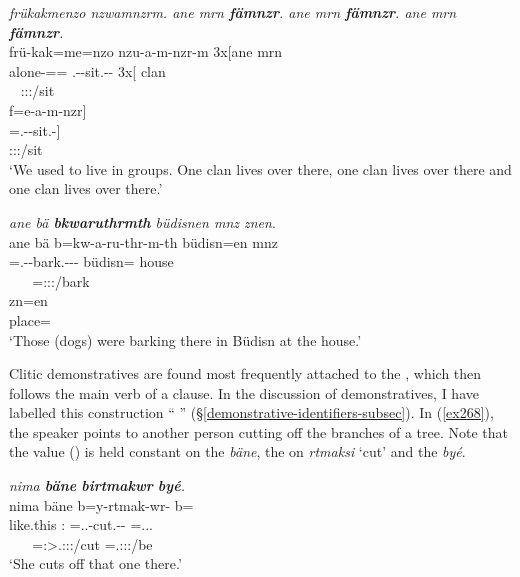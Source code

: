 \begin{exe}
	\ex \emph{frükakmenzo nzwamnzrm. ane mrn \textbf{fämnzr}. ane mrn \textbf{fämnzr}. ane mrn \textbf{fämnzr}.}\\
	\glll frü-kak=me=nzo nzu-a-m-nzr-m 3x[ane mrn\\
	alone-\Distr=\Ins={\Only} \Fnsg.\Betatwo-\Vc-sit.\Ext-\Ndu-\Dur{} 3x[{\Dem} clan\\
	~ {\footnotesize \Fpl:\Sbj:\Pst:\Dur/sit} ~ ~\\
	\sn
	\glll f=e-a-m-nzr]\\
	\Dist=\Stnsg.\Alph-\Vc-sit.\Ext-\Ndu]\\
	{\footnotesize \Stpl:\Sbj:\Nonpast:\Ipfv/sit}\\
	\trans `We used to live in groups. One clan lives over there, one clan lives over there and one clan lives over there.' 
	\label{ex266}
\end{exe}
\begin{exe}
	\ex \emph{ane bä \textbf{bkwaruthrmth} büdisnen mnz znen}.\\
	\glll ane bä b=kw-a-ru-thr-m-th büdisn=en mnz\\
	{\Dem} \Med{} \Med=\M.\Betaone-\Vc-bark.\Ext-\Ndu-\Dur-\Stnsg{} büdisn={\Loc} house\\
	~ ~ {\footnotesize \Med=\Stpl:\Sbj:\Pst:\Dur/bark} ~ ~ ~\\
	\sn
	\gll zn=en\\
	place={\Loc}\\
	\trans `Those (dogs) were barking there in Büdisn at the house.' 
	\label{ex267}
\end{exe}

Clitic demonstratives are found most frequently attached to the , which then follows the main verb of a clause. In the discussion of demonstratives, I have labelled this construction `` '' ({\S}\ref{demonstrative-identifiers-subsec}). In (\ref{ex268}), the speaker points to another person cutting off the branches of a tree. Note that the  value (\Med) is held constant on the   \emph{bäne}, the   on \emph{rtmaksi} `cut' and the   \emph{byé}.

\begin{exe}
	\ex \emph{nima \textbf{bäne} \textbf{birtmakwr} \textbf{byé}.}\\
	\glll nima bäne b=y-rtmak-wr-\Zero{} b=\\
	like.this \Dem:\Med{} \Med=\Tsg.\Masc.\Alph-cut.\Ext-\Ndu-\Stsg{} \Med=\Tsg.\Masc.\Cop.{\Ndu}\\
	~ ~ {\footnotesize \Med=\Stsg:\Sbj>\Tsg.\Masc:\Obj:\Nonpast:\Ipfv/cut} {\footnotesize \Med=\Tsg.\Masc:\Sbj:\Nonpast:\Ipfv/be}\\
	\trans `She cuts off that one there.' 
	\label{ex268}
\end{exe}


